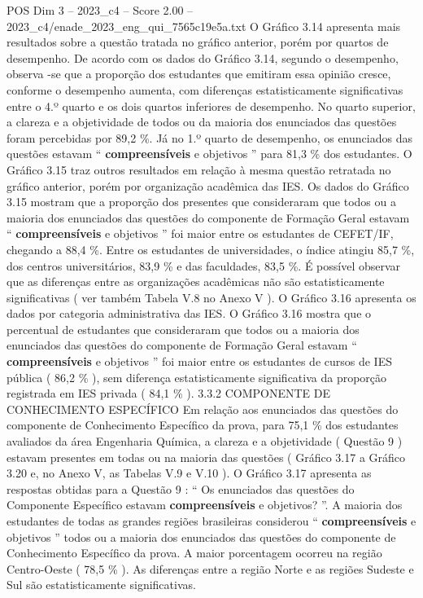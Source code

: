 \begin{textsample}{POS Dim 3 – 2023\_c4 – Score 2.00 – 2023\_c4/enade\_2023\_eng\_qui\_7565c19e5a.txt}
O Gráfico 3.14 apresenta mais resultados sobre a questão tratada no gráfico anterior, porém por quartos de desempenho.
De acordo com os dados do Gráfico 3.14, segundo o desempenho, observa -se que a proporção dos estudantes que emitiram essa opinião cresce, conforme o desempenho aumenta, com diferenças estatisticamente significativas entre o 4.º quarto e os dois quartos inferiores de desempenho.
No quarto superior, a clareza e a objetividade de todos ou da maioria dos enunciados das questões foram percebidas por 89,2 \%.
Já no 1.º quarto de desempenho, os enunciados das questões estavam “ \textbf{compreensíveis} e objetivos ” para 81,3 \% dos estudantes.
O Gráfico 3.15 traz outros resultados em relação à mesma questão retratada no gráfico anterior, porém por organização acadêmica das IES.
Os dados do Gráfico 3.15 mostram que a proporção dos presentes que consideraram que todos ou a maioria dos enunciados das questões do componente de Formação Geral estavam “ \textbf{compreensíveis} e objetivos ” foi maior entre os estudantes de CEFET/IF, chegando a 88,4 \%.
Entre os estudantes de universidades, o índice atingiu 85,7 \%, dos centros universitários, 83,9 \% e das faculdades, 83,5 \%.
É possível observar que as diferenças entre as organizações acadêmicas não são estatisticamente significativas ( ver também Tabela V.8 no Anexo V ).
O Gráfico 3.16 apresenta os dados por categoria administrativa das IES.
O Gráfico 3.16 mostra que o percentual de estudantes que consideraram que todos ou a maioria dos enunciados das questões do componente de Formação Geral estavam “ \textbf{compreensíveis} e objetivos ” foi maior entre os estudantes de cursos de IES pública ( 86,2 \% ), sem diferença estatisticamente significativa da proporção registrada em IES privada ( 84,1 \% ). 3.3.2 COMPONENTE DE CONHECIMENTO ESPECÍFICO Em relação aos enunciados das questões do componente de Conhecimento Específico da prova, para 75,1 \% dos estudantes avaliados da área Engenharia Química, a clareza e a objetividade ( Questão 9 ) estavam presentes em todas ou na maioria das questões ( Gráfico 3.17 a Gráfico 3.20 e, no Anexo V, as Tabelas V.9 e V.10 ).
O Gráfico 3.17 apresenta as respostas obtidas para a Questão 9 : “ Os enunciados das questões do Componente Específico estavam \textbf{compreensíveis} e objetivos? ”.
A maioria dos estudantes de todas as grandes regiões brasileiras considerou “ \textbf{compreensíveis} e objetivos ” todos ou a maioria dos enunciados das questões do componente de Conhecimento Específico da prova.
A maior porcentagem ocorreu na região Centro-Oeste ( 78,5 \% ).
As diferenças entre a região Norte e as regiões Sudeste e Sul são estatisticamente significativas.

\end{textsample}
